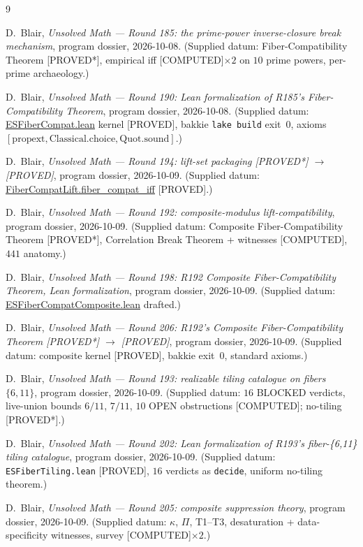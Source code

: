 \documentclass[11pt,a4paper]{article}
\theoremstyle{definition}
\begin{document}
\begin{thebibliography}{9}

D.~Blair,
\emph{Unsolved Math --- Round 185: the prime-power inverse-closure
break mechanism},
program dossier, 2026-10-08.
(Supplied datum: Fiber-Compatibility Theorem [PROVED*], empirical iff
[COMPUTED]$\times2$ on $10$ prime powers, per-prime archaeology.)

D.~Blair,
\emph{Unsolved Math --- Round 190: Lean formalization of R185's
Fiber-Compatibility Theorem},
program dossier, 2026-10-08.
(Supplied datum: \url{ESFiberCompat.lean} kernel [PROVED], bakkie
\texttt{lake build} exit~$0$, axioms
$[\mathrm{propext},\mathrm{Classical.choice},\mathrm{Quot.sound}]$.)

D.~Blair,
\emph{Unsolved Math --- Round 194: lift-set packaging [PROVED*] $\to$
[PROVED]},
program dossier, 2026-10-09.
(Supplied datum: \url{FiberCompatLift.fiber_compat_iff} [PROVED].)

D.~Blair,
\emph{Unsolved Math --- Round 192: composite-modulus lift-compatibility},
program dossier, 2026-10-09.
(Supplied datum: Composite Fiber-Compatibility Theorem [PROVED*],
Correlation Break Theorem + witnesses [COMPUTED], $441$ anatomy.)

D.~Blair,
\emph{Unsolved Math --- Round 198: R192 Composite Fiber-Compatibility
Theorem, Lean formalization},
program dossier, 2026-10-09.
(Supplied datum: \url{ESFiberCompatComposite.lean} drafted.)

D.~Blair,
\emph{Unsolved Math --- Round 206: R192's Composite Fiber-Compatibility
Theorem [PROVED*] $\to$ [PROVED]},
program dossier, 2026-10-09.
(Supplied datum: composite kernel [PROVED], bakkie exit~$0$, standard
axioms.)

D.~Blair,
\emph{Unsolved Math --- Round 193: realizable tiling catalogue on
fibers $\{6,11\}$},
program dossier, 2026-10-09.
(Supplied datum: $16$ BLOCKED verdicts, live-union bounds $6/11$,
$7/11$, $10$ OPEN obstructions [COMPUTED]; no-tiling [PROVED*].)

D.~Blair,
\emph{Unsolved Math --- Round 202: Lean formalization of R193's
fiber-\{6,11\} tiling catalogue},
program dossier, 2026-10-09.
(Supplied datum: \texttt{ESFiberTiling.lean} [PROVED], $16$ verdicts as
\texttt{decide}, uniform no-tiling theorem.)

D.~Blair,
\emph{Unsolved Math --- Round 205: composite suppression theory},
program dossier, 2026-10-09.
(Supplied datum: $\kappa$, $\Pi$, T1--T3, desaturation + data-specificity
witnesses, survey [COMPUTED]$\times2$.)


\end{thebibliography}
\end{document}
